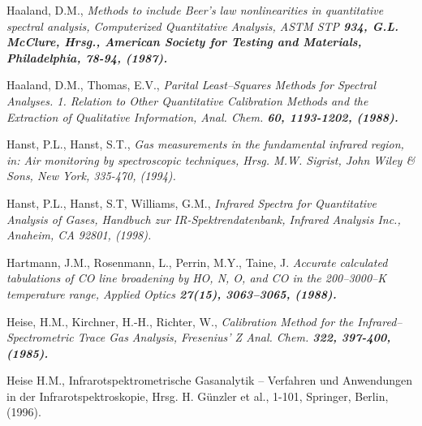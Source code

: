 \begin{thebibliography}{giese-bogdan,199797}
 Haaland, D.M., \it Methods to include Beer's
law nonlinearities in quantitative spectral analysis\rm ,
Computerized Quantitative Analysis, ASTM STP \bf 934\rm , G.L.
McClure, Hrsg., American Society for Testing and Materials,
Philadelphia, 78-94, (1987).

 Haaland, D.M., Thomas, E.V.,
\it Parital Least--Squares Methods for Spectral Analyses. 1.
Relation to Other Quantitative Calibration Methods and the
Extraction of Qualitative Information\rm , Anal. Chem. \bf 60\rm,
1193-1202, (1988).

 Hanst, P.L., Hanst, S.T., \it Gas
measurements in the fundamental infrared region\rm , in: Air
monitoring by spectroscopic techniques, Hrsg. M.W. Sigrist, John
Wiley \& Sons, New York, 335-470, (1994).


 Hanst, P.L., Hanst, S.T, Williams,
G.M., \it Infrared Spectra for Quantitative Analysis of Gases\rm ,
Handbuch zur IR-Spektrendatenbank, Infrared Analysis Inc.,
Anaheim, CA 92801, (1998).


 Hartmann, J.M., Rosenmann,
L., Perrin, M.Y., Taine, J. \it Accurate calculated tabulations of
CO line broadening by HO, N, O, and
CO in the 200--3000--K temperature range\rm , Applied
Optics \bf 27\rm (15), 3063--3065, (1988).

 Heise, H.M., Kirchner, H.-H.,
Richter, W., \it Calibration Method for the
Infrared--Spectrometric Trace Gas Analysis\rm , Fresenius' Z Anal.
Chem. \bf 322\rm , 397-400, (1985).

 Heise H.M., Infrarotspektrometrische
Gasanalytik -- Verfahren und Anwendungen in der
Infrarotspektroskopie, Hrsg. H. G\"{u}nzler et al., 1-101, Springer,
Berlin, (1996).



\end{thebibliography}
